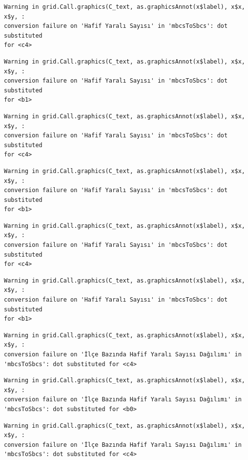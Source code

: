 \documentclass[
  11pt,
  a4paper,
  DIV=11,
  numbers=noendperiod]{scrartcl}
\begin{document}
\begin{verbatim}
Warning in grid.Call.graphics(C_text, as.graphicsAnnot(x$label), x$x, x$y, :
conversion failure on 'Hafif Yaralı Sayısı' in 'mbcsToSbcs': dot substituted
for <c4>
\end{verbatim}

\begin{verbatim}
Warning in grid.Call.graphics(C_text, as.graphicsAnnot(x$label), x$x, x$y, :
conversion failure on 'Hafif Yaralı Sayısı' in 'mbcsToSbcs': dot substituted
for <b1>
\end{verbatim}

\begin{verbatim}
Warning in grid.Call.graphics(C_text, as.graphicsAnnot(x$label), x$x, x$y, :
conversion failure on 'Hafif Yaralı Sayısı' in 'mbcsToSbcs': dot substituted
for <c4>
\end{verbatim}

\begin{verbatim}
Warning in grid.Call.graphics(C_text, as.graphicsAnnot(x$label), x$x, x$y, :
conversion failure on 'Hafif Yaralı Sayısı' in 'mbcsToSbcs': dot substituted
for <b1>
\end{verbatim}

\begin{verbatim}
Warning in grid.Call.graphics(C_text, as.graphicsAnnot(x$label), x$x, x$y, :
conversion failure on 'Hafif Yaralı Sayısı' in 'mbcsToSbcs': dot substituted
for <c4>
\end{verbatim}

\begin{verbatim}
Warning in grid.Call.graphics(C_text, as.graphicsAnnot(x$label), x$x, x$y, :
conversion failure on 'Hafif Yaralı Sayısı' in 'mbcsToSbcs': dot substituted
for <b1>
\end{verbatim}

\begin{verbatim}
Warning in grid.Call.graphics(C_text, as.graphicsAnnot(x$label), x$x, x$y, :
conversion failure on 'İlçe Bazında Hafif Yaralı Sayısı Dağılımı' in
'mbcsToSbcs': dot substituted for <c4>
\end{verbatim}

\begin{verbatim}
Warning in grid.Call.graphics(C_text, as.graphicsAnnot(x$label), x$x, x$y, :
conversion failure on 'İlçe Bazında Hafif Yaralı Sayısı Dağılımı' in
'mbcsToSbcs': dot substituted for <b0>
\end{verbatim}

\begin{verbatim}
Warning in grid.Call.graphics(C_text, as.graphicsAnnot(x$label), x$x, x$y, :
conversion failure on 'İlçe Bazında Hafif Yaralı Sayısı Dağılımı' in
'mbcsToSbcs': dot substituted for <c4>
\end{verbatim}
\end{document}
